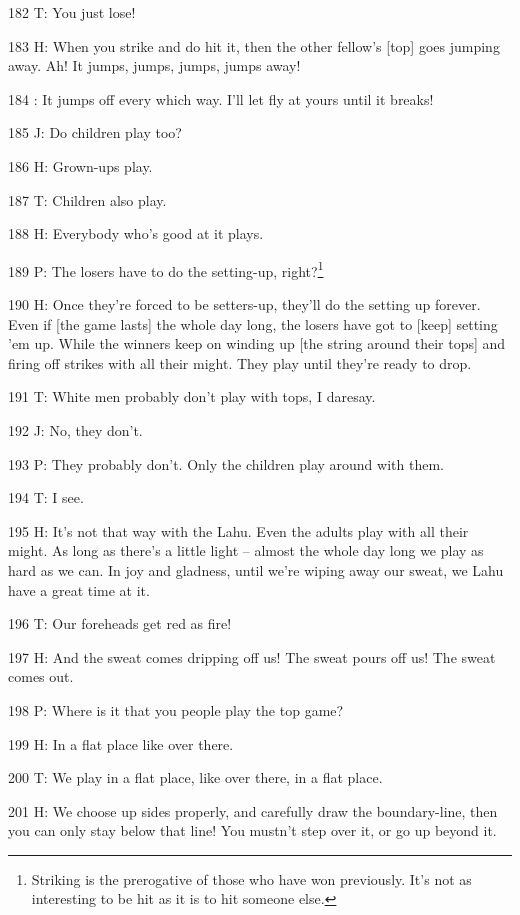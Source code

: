 182 T: You just lose!

183 H: When you strike and do hit it, then the other fellow's [top] goes jumping
away. Ah! It jumps, jumps, jumps, jumps away!

184 : It jumps off every which way. I'll let fly at yours until it breaks!

185 J: Do children play too?

186 H: Grown-ups play.

187 T: Children also play.

188 H: Everybody who's good at it plays.

189 P: The losers have to do the setting-up, right?\footnote{Striking is the prerogative of those who have won previously. It's not as interesting to be hit as it is to hit someone else.}

190 H: Once they're forced to be setters-up, they'll do the setting up forever.
Even if [the game lasts] the whole day long, the losers have got to [keep] setting
'em up. While the winners keep on winding up [the string around their tops] and
firing off strikes with all their might. They play until they're ready to drop.

191 T: White men probably don't play with tops, I daresay.

192 J: No, they don't.

193 P: They probably don't. Only the children play around with them.

194 T: I see.

195 H: It's not that way with the Lahu. Even the adults play with all their might.
As long as there's a little light -- almost the whole day long we play as hard
as we can. In joy and gladness, until we're wiping away our sweat, we Lahu have
a great time at it.

196 T: Our foreheads get red as fire!

197 H: And the sweat comes dripping off us! The sweat pours off us! The sweat comes
out.

198 P: Where is it that you people play the top game?

199 H: In a flat place like over there.

200 T: We play in a flat place, like over there, in a flat place.

201 H: We choose up sides properly, and carefully draw the boundary-line, then
you can only stay below that line! You mustn't step over it, or go up beyond it.

